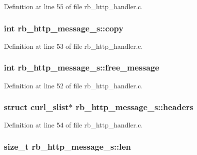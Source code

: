 Definition at line 55 of file rb\-\_\-http\-\_\-handler.\-c.

\hypertarget{structrb__http__message__s_aceda798a9af4f28a6dc89b273e6c348a}{
\subsubsection[{copy}]{\setlength{\rightskip}{0pt plus 5cm}int rb\-\_\-http\-\_\-message\-\_\-s\-::copy}}\label{structrb__http__message__s_aceda798a9af4f28a6dc89b273e6c348a}


Definition at line 53 of file rb\-\_\-http\-\_\-handler.\-c.

\hypertarget{structrb__http__message__s_acbfdd79b7ec041a7b7e0edac1da72d30}{
\subsubsection[{free\-\_\-message}]{\setlength{\rightskip}{0pt plus 5cm}int rb\-\_\-http\-\_\-message\-\_\-s\-::free\-\_\-message}}\label{structrb__http__message__s_acbfdd79b7ec041a7b7e0edac1da72d30}


Definition at line 52 of file rb\-\_\-http\-\_\-handler.\-c.

\hypertarget{structrb__http__message__s_ae12176a1bd60ed536eda95e2c530acc4}{
\subsubsection[{headers}]{\setlength{\rightskip}{0pt plus 5cm}struct curl\-\_\-slist$\ast$ rb\-\_\-http\-\_\-message\-\_\-s\-::headers}}\label{structrb__http__message__s_ae12176a1bd60ed536eda95e2c530acc4}


Definition at line 54 of file rb\-\_\-http\-\_\-handler.\-c.

\hypertarget{structrb__http__message__s_a8c352ee939f1cd197bf009583e61552f}{
\subsubsection[{len}]{\setlength{\rightskip}{0pt plus 5cm}size\-\_\-t rb\-\_\-http\-\_\-message\-\_\-s\-::len}}\label{structrb__http__message__s_a8c352ee939f1cd197bf009583e61552f}


